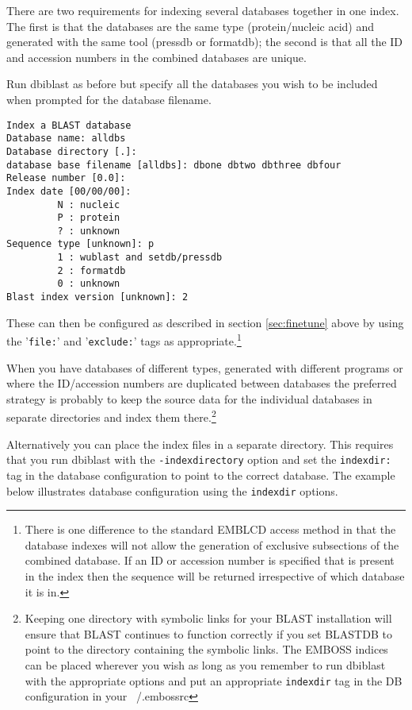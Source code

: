 \documentclass{report}
\newcommand{\ilcomm}[1]{{\tt #1}}
\newcommand{\progname}[1]{{\sc #1}}
\begin{document}
There are two requirements for indexing several databases together in one index. The first is that the databases are the same type (protein/nucleic acid) and generated with the same tool (pressdb or formatdb); the second is that all the ID and accession numbers in the combined databases are unique.

Run \progname{dbiblast} as before but specify all the databases you wish to be included when prompted for the database filename.

\begin{verbatim}
Index a BLAST database
Database name: alldbs
Database directory [.]: 
database base filename [alldbs]: dbone dbtwo dbthree dbfour 
Release number [0.0]: 
Index date [00/00/00]: 
         N : nucleic
         P : protein
         ? : unknown
Sequence type [unknown]: p
         1 : wublast and setdb/pressdb
         2 : formatdb
         0 : unknown
Blast index version [unknown]: 2

\end{verbatim}

These can then be configured as described in section \ref{sec:finetune} above by using the '\ilcomm{file:}' and '\ilcomm{exclude:}' tags as appropriate.\footnote{There is one difference to the standard EMBLCD access method in that the database indexes will not allow the generation of exclusive subsections of the combined database. If an ID or accession number is specified that is present in the index then the sequence will be returned irrespective of which database it is in.}

When you have databases of different types, generated with different programs or where the ID/accession numbers are duplicated between databases the preferred strategy is probably to keep the source data for the individual databases in separate directories and index them there.\footnote{Keeping one directory with symbolic links for your BLAST installation will ensure that BLAST continues to function correctly if you set BLASTDB to point to the directory containing the symbolic links. The EMBOSS indices can be placed wherever you wish as long as you remember to run \progname{dbiblast} with the appropriate options and put an appropriate \ilcomm{indexdir} tag in the DB configuration in your ~/.embossrc}

Alternatively you can place the index files in a separate directory. This requires that you run \progname{dbiblast} with the \ilcomm{-indexdirectory} option and set the \ilcomm{indexdir:} tag in the database configuration to point to the correct database. The example below illustrates database configuration using the \ilcomm{indexdir} options.
\end{document}
